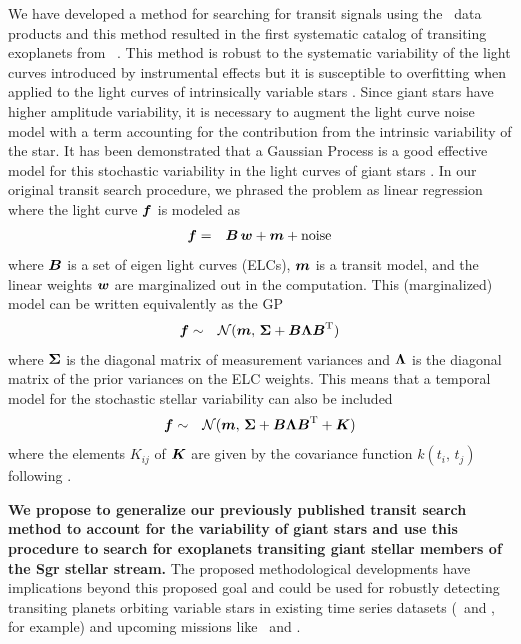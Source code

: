 \documentclass[letterpaper,12pt,preprint]{hack_aastex}
\begin{document}
We have developed a method for searching for transit signals using the \KT\
data products and this method resulted in the first systematic catalog of
transiting exoplanets from \KT\ \citep{Foreman-Mackey:2015}.
This method is robust to the systematic variability of the light curves
introduced by instrumental effects but it is susceptible to overfitting when
applied to the light curves of intrinsically variable stars
\citep{Montet:2015}.
Since giant stars have higher amplitude variability, it is necessary to
augment the light curve noise model with a term accounting for the
contribution from the intrinsic variability of the star.
It has been demonstrated that a Gaussian Process \citep[GP;][]{Rasmussen:2006,
Ambikasaran:2014} is a good effective model for this stochastic variability in
the light curves of giant stars \citep{Barclay:2015}.
In our original transit search procedure, we phrased the problem as linear
regression \citep{Foreman-Mackey:2015} where the light curve ${{\boldsymbol{f}}}$ is
modeled as
\begin{eqnarray}
{\ensuremath{{\boldsymbol{f}}}} &=& {{\boldsymbol{B}}}\,{{\boldsymbol{w}}} + {{\boldsymbol{m}}} + \mathrm{noise}
\end{eqnarray}
where ${{\boldsymbol{B}}}$ is a set of eigen light curves (ELCs), ${{\boldsymbol{m}}}$ is a
transit model, and the linear weights ${{\boldsymbol{w}}}$ are marginalized out in the
computation.
This (marginalized) model can be written equivalently as the GP
\citep{Rasmussen:2006}
\begin{eqnarray}
{\ensuremath{{\boldsymbol{f}}}} &\sim& \mathcal{N} ({{\boldsymbol{m}}},\,
{{\boldsymbol{\Sigma}}} + {{\boldsymbol{B}}}{{\boldsymbol{\Lambda}}}{{\boldsymbol{B}}}^\mathrm{T})
\end{eqnarray}
where ${{\boldsymbol{\Sigma}}}$ is the diagonal matrix of measurement variances and
${{\boldsymbol{\Lambda}}}$ is the diagonal matrix of the prior variances on the ELC
weights.
This means that a temporal model for the stochastic stellar variability can
also be included
\begin{eqnarray}
{\ensuremath{{\boldsymbol{f}}}} &\sim& \mathcal{N} ({{\boldsymbol{m}}},\,
{{\boldsymbol{\Sigma}}} + {{\boldsymbol{B}}}{{\boldsymbol{\Lambda}}}{{\boldsymbol{B}}}^\mathrm{T} + {{\boldsymbol{K}}})
\end{eqnarray}
where the elements $K_{ij}$ of ${{\boldsymbol{K}}}$ are given by the covariance function
$k(t_i,\,t_j)$ following \citep{Barclay:2015}.

{\bf We propose to generalize our previously published transit search method
\citep{Foreman-Mackey:2015} to account for the variability of giant stars and
use this procedure to search for exoplanets transiting giant stellar members
of the Sgr stellar stream.} The proposed methodological developments have
implications beyond this proposed goal and could be used for robustly
detecting transiting planets orbiting variable stars in existing time series
datasets (\KT\ and \kepler, for example) and upcoming missions like \TESS\ and
\PLATO.
\end{document}
